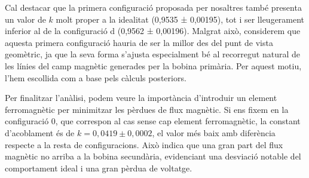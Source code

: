 \documentclass[a4paper,10.5pt]{report}
\begin{document}
Cal destacar que la primera configuració proposada per nosaltres també presenta un valor de $k$ molt proper a la idealitat (0,9535 ± 0,00195), tot i ser lleugerament inferior al de la configuració d (0,9562 ± 0,00196). Malgrat això, considerem que aquesta primera configuració hauria de ser la millor des del punt de vista geomètric, ja que la seva forma s’ajusta especialment bé al recorregut natural de les línies del camp magnètic generades per la bobina primària. Per aquest motiu, l’hem escollida com a base pels càlculs posteriors.

Per finalitzar l'anàlisi, podem veure la importància d’introduir un element ferromagnètic per minimitzar les pèrdues de flux magnètic. Si ens fixem en la configuració 0, que correspon al cas sense cap element ferromagnètic, la constant d’acoblament és de $k = 0,0419 \pm 0,0002 $, el valor més baix amb diferència respecte a la resta de configuracions. Això indica que una gran part del flux magnètic no arriba a la bobina secundària, evidenciant una desviació notable del comportament ideal i una gran pèrdua de voltatge.
\end{document}
